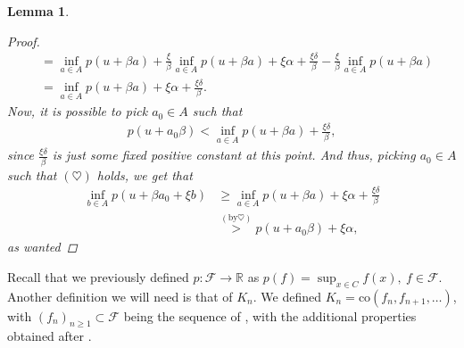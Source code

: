\documentclass[10pt,twoside,openany,final]{memoir}
\theoremstyle{break}
\newtheorem{lemma}[section]{Lemma}
\theoremstyle{Break}
\newcommand{\R}{\mathbb{R}}
\begin{document}
\begin{lemma}
\begin{proof}
\begin{align*}
&= \inf_{a \in A} p(u+\beta a) + \frac{\xi}{\beta} \inf_{a \in A} p(u+\beta a) + \xi \alpha + \frac{\xi \delta}{\beta} - \frac{\xi}{\beta} \inf_{a \in A} p(u+\beta a)\\
&=  \inf_{a \in A} p(u + \beta a) + \xi \alpha + \frac{\xi \delta}{\beta}.
\end{align*}
Now, it is possible to pick $a_{0} \in A$ such that
\begin{align*}
p(u+a_{0} \beta) < \inf_{a \in A} p(u+\beta a) + \frac{\xi \delta}{\beta}, \tag{$\heartsuit$}
\end{align*}
since $\frac{\xi \delta}{\beta}$ is just some fixed positive constant at this point.
And thus, picking $a_{0} \in A$ such that $(\heartsuit)$ holds, we get that
\begin{align*}
\inf_{b \in A} p(u+\beta a_{0}+\xi b) &\geq  \inf_{a \in A} p(u + \beta a) + \xi \alpha + \frac{\xi \delta}{\beta}\\
&\stackrel{(\text{by} \heartsuit)}{>} p(u+a_{0} \beta)+ \xi \alpha,
\end{align*}
as wanted
\end{proof}
\end{lemma}
Recall that we previously defined $p\colon \mathcal{F} \to \R$ as $\displaystyle p(f)=\sup_{x \in C} f(x), \ f \in \mathcal{F}$.
Another definition we will need is that of $K_n$.
We defined $K_{n}=\text{co}(f_{n},f_{n+1},\dots)$, with $(f_{n})_{n\geq 1} \subset \mathcal{F}$ being the sequence of , with the additional properties obtained after .
\end{document}
